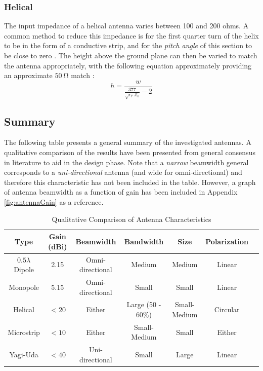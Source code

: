 \subsubsection{Helical}\label{sec:helical_matching}
The input impedance of a helical antenna varies between 100 and 200 ohms. A common method to reduce this impedance is for the first quarter turn of the helix to be in the form of a conductive strip, and for the \textit{pitch angle} of this section to be close to zero \cite{textbook-antennaTheoryAnalysisDesign}. The height above the ground plane can then be varied to match the antenna appropriately, with the following equation approximately providing an approximate $\SI{50}{\ohm}$ match \cite{textbook-antennaTheoryAnalysisDesign}:
$$h = \frac{w}{\frac{377}{\sqrt{\epsilon_r} Z_0} - 2}$$

\subsection{Summary}
The following table presents a general summary of the investigated antennas. A qualitative comparison of the results have been presented from general consensus in literature to aid in the design phase. Note that a \textit{narrow} beamwidth general corresponds to a \textit{uni-directional} antenna (and wide for omni-directional) and therefore this characteristic has not been included in the table. However, a graph of antenna beamwidth as a function of gain has been included in Appendix \ref{fig:antennaGain} as a reference.

\begin{table}[!htb]
  \centering
  \renewcommand{\arraystretch}{1.2}
  \hspace*{-0.8cm}
  \begin{tabular}{ |c|c|c|c|c|c|c| }
  \hline
  \textbf{Type} & \textbf{Gain (dBi)} & \textbf{Beamwidth} & \textbf{Bandwidth} & \textbf{Size} & \textbf{Polarization} \\ \hline
  $0.5 \lambda$ Dipole & 2.15 & Omni-directional & Medium & Medium & Linear \\ \hline
  Monopole & 5.15 & Omni-directional & Small & Small & Linear \\ \hline
  Helical & $<20$ & Either & Large (50 - 60\%) & Small-Medium & Circular \\ \hline
  Microstrip & $<10$ & Either & Small-Medium & Small & Either \\ \hline
  Yagi-Uda & $<40$ & Uni-directional & Small & Large & Linear \\ \hline
  \end{tabular}
  \caption{Qualitative Comparison of Antenna Characteristics \cite{site-antennaTheory}}
  \label{tab:antenna_characteristics}
\end{table}